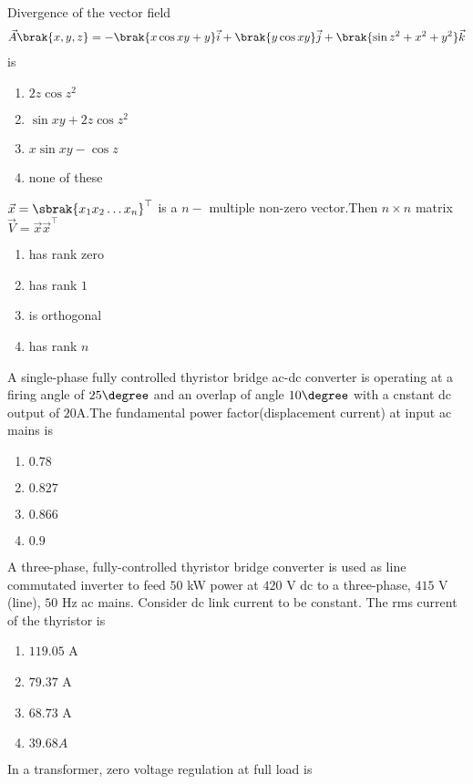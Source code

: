 \item Divergence of the vector field 
\begin{align}
    \vec{A}\brak{x,y,z} = -\brak{x \cos{xy}+y}\vec{i} + \brak{y \cos{xy}}\vec{j} + \brak{\sin{z^2}+x^2+y^2}\vec{k}
\end{align}
is
\begin{enumerate}
    \item $2z \cos{z^2}$
    \item $\sin{xy}+2z\cos{z^2}$
    \item $x\sin{xy}-\cos{z}$
    \item none of these\\
\end{enumerate}
\item $\vec{x} = \sbrak{x_1 x_2 \dots x_n}^\top$ is a $n - $ multiple non-zero vector.Then $n\times n$ matrix $\vec{V} = \vec{x}\vec{x}^\top$
\begin{enumerate}
    \item has rank zero
    \item has rank $1$
    \item is orthogonal
    \item has rank $n$
\end{enumerate}
\item A single-phase fully controlled thyristor bridge ac-dc converter is operating at a firing angle of $25\degree$ and an overlap of angle $10\degree$ with a cnstant dc output of $20\text{A}$.The fundamental power factor(displacement current) at input ac mains is
\begin{enumerate}
    \item $0.78$
    \item $0.827$
    \item $0.866$
    \item $0.9$
\end{enumerate}
\item  A three-phase, fully-controlled thyristor bridge converter is used as line commutated
inverter to feed $50$ kW power at $420$ V dc to a three-phase, $415$ V (line), $50$ Hz ac
mains. Consider dc link current to be constant. The rms current of the thyristor is 
\begin{enumerate}
\item $119.05$ A  \item $79.37$ A \item $68.73$ A 
\item $39.68 A$
\end{enumerate}
    \item In a transformer, zero voltage regulation at full load is 
